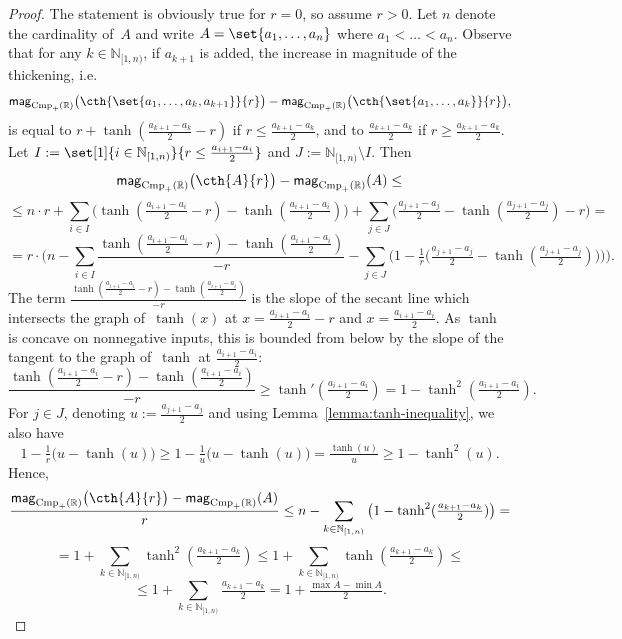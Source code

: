\documentclass[11pt]{article}
\theoremstyle{plain}
\theoremstyle{definition}
\newcommand{\NN}{\mathbb{N}}
\newcommand{\RR}{\mathbb{R}}
\newcommand{\intco}[3][\RR]{{#1}_{[#2, #3)}}
\newcommand{\mg}[1][]{\mathsf{mag}_{#1}}
\newcommand{\csub}{\mathrm{Cmp}}
\newcommand{\icsub}{\csub_{+}}
\begin{document}
\begin{proof}
The statement is obviously true for $r = 0$, so assume $r > 0$. Let $n$ denote the cardinality of~$A$ and write $A = \set{a_1, \ldots, a_n}$ where $a_1 < \ldots < a_n$. Observe that for any $k \in \intco[\NN]{1}{n}$, if $a_{k+1}$ is added, the increase in magnitude of the thickening, i.e.
\[\mg[\icsub(\RR)]\big(\cth{\set{a_1, \ldots, a_k, a_{k+1}}}{r}\big) - \mg[\icsub(\RR)]\big(\cth{\set{a_1, \ldots, a_k}}{r}\big),\]
is equal to $r + \tanh(\tfrac{a_{k+1} - a_k}{2} - r)$ if $r \leq \tfrac{a_{k+1} - a_k}{2}$, and to $\tfrac{a_{k+1} - a_k}{2}$ if $r \geq \tfrac{a_{k+1} - a_k}{2}$. Let $I := \set[1]{i \in \intco[\NN]{1}{n}}{r \leq \tfrac{a_{i+1} - a_i}{2}}$ and $J := \intco[\NN]{1}{n} \setminus I$. Then
\[\mg[\icsub(\RR)]\big(\cth{A}{r}\big) - \mg[\icsub(\RR)](A) \leq\]
\[\leq n \cdot r + \sum_{i \in I} \big(\tanh(\tfrac{a_{i+1} - a_i}{2} - r) - \tanh(\tfrac{a_{i+1} - a_i}{2})\big) + \sum_{j \in J} \big(\tfrac{a_{j+1} - a_j}{2} - \tanh(\tfrac{a_{j+1} - a_j}{2}) - r\big) =\]
\[= r \cdot \Big(n - \sum_{i \in I} \frac{\tanh(\tfrac{a_{i+1} - a_i}{2} - r) - \tanh(\tfrac{a_{i+1} - a_i}{2})}{-r} - \sum_{j \in J} \big(1 - \tfrac{1}{r} \big(\tfrac{a_{j+1} - a_j}{2} - \tanh(\tfrac{a_{j+1} - a_j}{2})\big)\big)\Big).\]
The term $\frac{\tanh(\tfrac{a_{i+1} - a_i}{2} - r) - \tanh(\tfrac{a_{i+1} - a_i}{2})}{-r}$ is the slope of the secant line which intersects the graph of~$\tanh(x)$ at $x = \tfrac{a_{i+1} - a_i}{2} - r$ and $x = \tfrac{a_{i+1} - a_i}{2}$. As $\tanh$ is concave on nonnegative inputs, this is bounded from below by the slope of the tangent to the graph of~$\tanh$ at $\tfrac{a_{i+1} - a_i}{2}$:
\[\frac{\tanh(\tfrac{a_{i+1} - a_i}{2} - r) - \tanh(\tfrac{a_{i+1} - a_i}{2})}{-r} \geq \tanh'(\tfrac{a_{i+1} - a_i}{2}) = 1 - \tanh^2(\tfrac{a_{i+1} - a_i}{2}).\]
For $j \in J$, denoting $u := \tfrac{a_{j+1} - a_j}{2}$ and using Lemma~\ref{lemma:tanh-inequality}, we also have
\[1 - \tfrac{1}{r} \big(u - \tanh(u)\big) \geq 1 - \tfrac{1}{u} \big(u - \tanh(u)\big) = \tfrac{\tanh(u)}{u} \geq 1 - \tanh^2(u).\]
Hence,
\[\frac{\mg[\icsub(\RR)]\big(\cth{A}{r}\big) - \mg[\icsub(\RR)](A)}{r} \leq n - \sum_{k \in \intco[\NN]{1}{n}} \big(1 - \tanh^2(\tfrac{a_{k+1} - a_k}{2})\big) =\]
\[= 1 + \sum_{k \in \intco[\NN]{1}{n}} \tanh^2(\tfrac{a_{k+1} - a_k}{2}) \leq 1 + \sum_{k \in \intco[\NN]{1}{n}} \tanh(\tfrac{a_{k+1} - a_k}{2}) \leq\]
\[\leq 1 + \sum_{k \in \intco[\NN]{1}{n}} \tfrac{a_{k+1} - a_k}{2} = 1 + \tfrac{\max{A} - \min{A}}{2}.\]
\end{proof}
\end{document}
